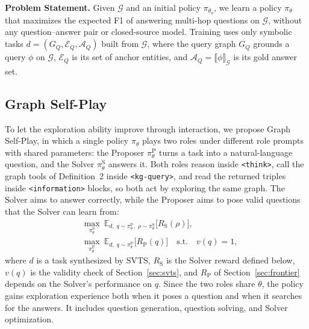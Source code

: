 \textbf{Problem Statement.}
Given $\mathcal{G}$ and an initial policy $\pi_{\theta_0}$, we learn a policy $\pi_\theta$ that maximizes the expected F1 of answering multi-hop questions on $\mathcal{G}$, without any question--answer pair or closed-source model. Training uses only symbolic tasks $d=(G_Q,\mathcal{E}_Q,\mathcal{A}_Q)$ built from $\mathcal{G}$, where the query graph $G_Q$ grounds a query $\phi$ on $\mathcal{G}$, $\mathcal{E}_Q$ is its set of anchor entities, and $\mathcal{A}_Q=\llbracket\phi\rrbracket_{\mathcal{G}}$ is its gold answer set.

\subsection{Graph Self-Play}
\label{sec:selfplay}

To let the exploration ability improve through interaction, we propose Graph Self-Play, in which a single policy $\pi_\theta$ plays two roles under different role prompts with shared parameters: the Proposer $\pi_\theta^{\mathrm{P}}$ turns a task into a natural-language question, and the Solver $\pi_\theta^{\mathrm{S}}$ answers it. Both roles reason inside \texttt{<think>}, call the graph tools of Definition~2 inside \texttt{<kg-query>}, and read the returned triples inside \texttt{<information>} blocks, so both act by exploring the same graph. The Solver aims to answer correctly, while the Proposer aims to pose valid questions that the Solver can learn from:
\begin{equation}
\label{eq:game}
\begin{aligned}
&\max_{\pi_\theta^{\mathrm{S}}}\ \mathbb{E}_{d,\;q\sim\pi_\theta^{\mathrm{P}},\;\rho\sim\pi_\theta^{\mathrm{S}}}\bigl[R_{\mathrm{S}}(\rho)\bigr],\\
&\max_{\pi_\theta^{\mathrm{P}}}\ \mathbb{E}_{d,\;q\sim\pi_\theta^{\mathrm{P}}}\bigl[R_{\mathrm{P}}(q)\bigr]\quad\text{s.t.}\quad v(q)=1,
\end{aligned}
\end{equation}
where $d$ is a task synthesized by SVTS, $R_{\mathrm{S}}$ is the Solver reward defined below, $v(q)$ is the validity check of Section~\ref{sec:svts}, and $R_{\mathrm{P}}$ of Section~\ref{sec:frontier} depends on the Solver's performance on $q$. Since the two roles share $\theta$, the policy gains exploration experience both when it poses a question and when it searches for the answers. It includes question generation, question solving, and Solver optimization.

